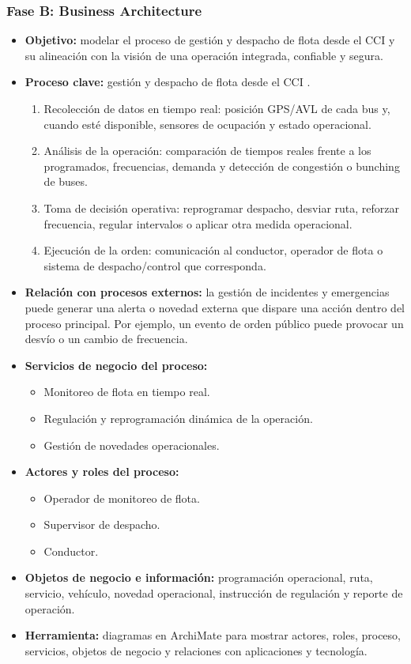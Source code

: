 \begin{singlespace}
\subsubsection*{Fase B: Business Architecture}

\begin{itemize}
	\item \textbf{Objetivo:} modelar el proceso de gestión y despacho de flota desde el CCI y su alineación con la visión de una operación integrada, confiable y segura.
	\item \textbf{Proceso clave:} gestión y despacho de flota desde el CCI \parencite{transmilenio2020peti}.
	\begin{enumerate}
		\item Recolección de datos en tiempo real: posición GPS/AVL de cada bus y, cuando esté disponible, sensores de ocupación y estado operacional.
		\item Análisis de la operación: comparación de tiempos reales frente a los programados, frecuencias, demanda y detección de congestión o bunching de buses.
		\item Toma de decisión operativa: reprogramar despacho, desviar ruta, reforzar frecuencia, regular intervalos o aplicar otra medida operacional.
		\item Ejecución de la orden: comunicación al conductor, operador de flota o sistema de despacho/control que corresponda.
	\end{enumerate}
	\item \textbf{Relación con procesos externos:} la gestión de incidentes y emergencias puede generar una alerta o novedad externa que dispare una acción dentro del proceso principal. Por ejemplo, un evento de orden público puede provocar un desvío o un cambio de frecuencia.
	\item \textbf{Servicios de negocio del proceso:}
	\begin{itemize}
		\item[$\Rightarrow$] Monitoreo de flota en tiempo real.
		\item[$\Rightarrow$] Regulación y reprogramación dinámica de la operación.
		\item[$\Rightarrow$] Gestión de novedades operacionales.
	\end{itemize}
	\item \textbf{Actores y roles del proceso:}
	\begin{itemize}
		\item[$\Rightarrow$] Operador de monitoreo de flota.
		\item[$\Rightarrow$] Supervisor de despacho.
		\item[$\Rightarrow$] Conductor.
	\end{itemize}
	\item \textbf{Objetos de negocio e información:} programación operacional, ruta, servicio, vehículo, novedad operacional, instrucción de regulación y reporte de operación.
	\item \textbf{Herramienta:} diagramas en ArchiMate para mostrar actores, roles, proceso, servicios, objetos de negocio y relaciones con aplicaciones y tecnología.
\end{itemize}


\end{singlespace}
